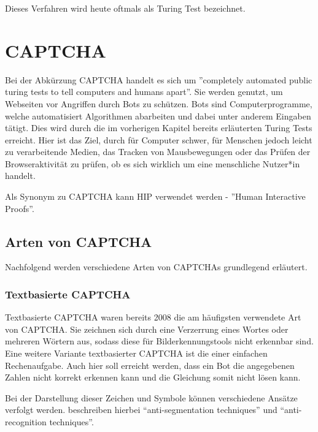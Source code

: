 Dieses Verfahren wird heute oftmals als Turing Test bezeichnet. 

\section{CAPTCHA}
\label{ch:basics:captcha}
Bei der Abkürzung CAPTCHA handelt es sich um ''completely automated public turing tests to tell computers and humans apart''. 
Sie werden genutzt, um Webseiten vor Angriffen durch Bots zu schützen. 
Bots sind Computerprogramme, welche automatisiert Algorithmen abarbeiten und dabei unter anderem Eingaben tätigt.
Dies wird durch die im vorherigen Kapitel bereits erläuterten Turing Tests erreicht. 
Hier ist das Ziel, durch für Computer schwer, für Menschen jedoch leicht zu verarbeitende Medien, das Tracken von Mausbewegungen
oder das Prüfen der Browseraktivität zu prüfen, ob es sich wirklich um eine menschliche Nutzer*in handelt.

Als Synonym zu CAPTCHA kann HIP verwendet werden - ''Human Interactive Proofs''. 

\subsection{Arten von CAPTCHA}
\label{ch:basics:captcha:arten}
Nachfolgend werden verschiedene Arten von CAPTCHAs grundlegend erläutert.
\subsubsection*{Textbasierte CAPTCHA}
Textbasierte CAPTCHA waren bereits 2008 die am häufigsten verwendete Art von CAPTCHA.
Sie zeichnen sich durch eine Verzerrung eines Wortes oder mehreren Wörtern aus, sodass diese für Bilderkennungstools nicht erkennbar sind.
Eine weitere Variante textbasierter CAPTCHA ist die einer einfachen Rechenaufgabe. 
Auch hier soll erreicht werden, dass ein Bot die angegebenen Zahlen nicht korrekt erkennen kann und die Gleichung somit nicht lösen kann. \cite[p.1]{usabilityofcaptchas} \cite[p.75]{surveyofresearch} \cite{shinde2018DIFFERENTTO} %

Bei der Darstellung dieser Zeichen und Symbole können verschiedene Ansätze verfolgt werden.
\citeauthor{surveyofresearch} beschreiben hierbei ``anti-segmentation techniques'' und ``anti-recognition techniques''. \cite[p.76]{surveyofresearch}

